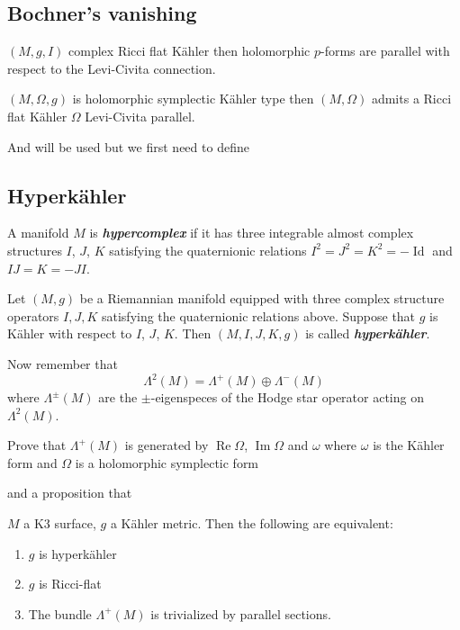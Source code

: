 \subsection{Bochner's vanishing}

\begin{thm}\leavevmode
	$(M,g,I)$ complex Ricci flat Kähler then holomorphic  $p$-forms are parallel with respect to the Levi-Civita connection.
\end{thm}

\begin{coro}\leavevmode
	$(M,\Omega,g)$ is holomorphic symplectic Kähler type then $(M,\Omega)$ admits a Ricci flat  Kähler $\Omega$ Levi-Civita parallel.
\end{coro}

And will be used but we first need to define

\subsection{Hyperkähler}

\begin{defn}\leavevmode
	A manifold $M$ is \textit{\textbf{hypercomplex}} if it has three integrable almost complex structures  $I$,  $J$, $K$ satisfying the quaternionic relations $I^2=J^2=K^2=-\operatorname{Id}$ and $I J=K=-J I$.
\end{defn}

\begin{defn}[Calabi, 1978]\leavevmode
	Let $(M,g)$ be a Riemannian manifold equipped with three complex structure operators $I,J,K$ satisfying the quaternionic relations above. Suppose that  $g$ is Kähler with respect to $I$, $J$, $K$. Then $(M,I,J,K,g)$ is called  \textit{\textbf{hyperkähler}}.
\end{defn}

Now remember that 
\[\Lambda^{2}(M)=\Lambda^{+}(M)\oplus \Lambda^{-}(M)\]
where $\Lambda^{\pm }(M)$ are the $\pm $-eigenspeces of the Hodge star operator acting on  $\Lambda^{2}(M)$.

\begin{exercise}\leavevmode
	Prove that $\Lambda^{+}(M)$ is generated by $\operatorname{Re}\Omega$, $\operatorname{Im} \Omega$ and $\omega$ where $\omega$ is the Kähler form and $ \Omega$ is a holomorphic symplectic form
\end{exercise}

and a proposition that
\begin{prop}\leavevmode
	$M$ a K3 surface, $g$ a Kähler metric. Then the following are equivalent:
	\begin{enumerate}[label=(\alph*)]
	\item $g$ is hyperkähler
	\item $g$ is Ricci-flat
	\item The bundle $\Lambda^+(M)$ is trivialized by parallel sections.
	\end{enumerate}
\end{prop}

